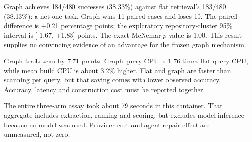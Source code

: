Graph achieves 184/480 successes (38.33\%) against flat retrieval's 183/480 (38.13\%): a net one task. Graph wins 11 paired cases and loses 10. The paired difference is +0.21 percentage points; the exploratory repository-cluster 95\% interval is [-1.67, +1.88] points. The exact McNemar $p$-value is 1.00. This result supplies no convincing evidence of an advantage for the frozen graph mechanism.

Graph trails scan by 7.71 points. Graph query CPU is 1.76 times flat query CPU, while mean build CPU is about 3.2\% higher. Flat and graph are faster than scanning per query, but that saving comes with lower observed accuracy. Accuracy, latency and construction cost must be reported together.

The entire three-arm assay took about 79 seconds in this container. That aggregate includes extraction, ranking and scoring, but excludes model inference because no model was used. Provider cost and agent repair effect are unmeasured, not zero.
